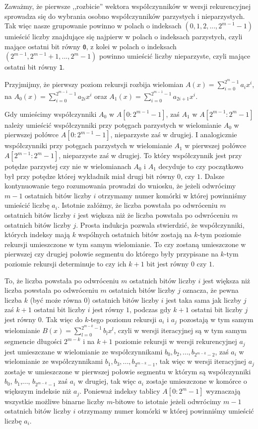 \documentclass{article}
\begin{document}
Zaważmy, że pierwsze ,,rozbicie'' wektora współczynników w wersji rekurencyjnej sprowadza się
do wybrania osobno współczynników parzystych i nieparzystych. Tak więc nasze grupowanie
powinno w polach o indeksach $(0,1,2,...,2^{m-1}-1)$ umieścić liczby znajdujące się najpierw 
w polach o indeksach parzystych, czyli mające ostatni bit równy \texttt{0}, z kolei 
w polach o indeksach $(2^{m-1},2^{m-1}+1,...,2^m-1)$ powinno umieścić liczby nieparzyste, czyli
mające ostatni bit równy \texttt{1}. 

Przyjmijmy, że pierwszy poziom rekursji rozbija wielomian
$A(x)=\sum_{i=0}^{2^m-1}a_ix^i$, na $A_0(x)=\sum_{i=0}^{2^{m-1}-1}a_{2i}x^{i}$ oraz
$A_1(x)=\sum_{i=0}^{2^{m-1}-1}a_{2i+1}x^{i}$. 

Gdy umieścimy współczynniki $A_0$ w $A[0:2^{m-1}-1]$, zaś $A_1$ w $A[2^{m-1}:2^m-1]$ należy umieścić 
współczynniki przy potęgach parzystych w wielomianie $A_0$ w pierwszej połówce 
$A[0:2^{m-1}-1]$, nieparzyste zaś w drugiej. I analogicznie współczynniki przy potęgach 
parzystych w wielomianie $A_1$ w pierwszej połówce 
$A[2^{m-1}:2^{m}-1]$, nieparzyste zaś w drugiej. To który współczynnik jest przy potędze 
parzystej czy nie w wielomianach $A_0$ i $A_1$ decyduje to czy początkowo był przy potędze
której wykładnik miał drugi bit równy $0$, czy $1$. Dalsze kontynuowanie tego rozumowania 
prowadzi do wniosku, że jeżeli odwrócimy $m-1$ ostatnich bitów liczby $i$ otrzymamy numer komórki
w której powinniśmy umieścić liczbę $a_i$. Istotnie załóżmy, że liczba powstała po odwróceniu $m$ ostatnich bitów liczby $i$ jest większa 
niż że liczba powstała po odwróceniu $m$ ostatnich bitów liczby $j$. Prosta indukcja pozwala stwierdzić, że współczynniki, których indeksy mają $k$ 
wspólnych ostatnich 
bitów zostają na $k$-tym poziomie rekursji umieszczone w tym samym wielomianie. 
To czy zostaną umieszczone w pierwszej czy drugiej połowie segmentu do którego były przypisane 
na $k$-tym poziomie rekursji determinuje to czy ich $k+1$ bit jest równy $0$ czy $1$.

To, że liczba powstała po odwróceniu $m$ ostatnich bitów liczby $i$ jest większa niż liczba powstała po odwróceniu 
$m$ ostatnich bitów liczby $j$ oznacza, że pewna liczba $k$ (być może równa 
$0$) ostatnich bitów liczby $i$ jest taka sama jak liczby $j$ 
zaś $k+1$ ostatni bit liczby $i$ jest równy $1$, podczas gdy $k+1$ ostatni bit liczby $j$
jest równy $0$.
Tak więc do $k$-tego poziomu rekursji $a_i$ i $a_j$ pozostają w tym samym wielomianie $B(x)=
\sum^{2^{m-k}-1}_{l=0} b_lx^l$, czyli w wersji iteracyjnej są w tym samym segmencie 
długości $2^{m-k}$ i na $k+1$ poziomie rekursji w wersji rekurencyjnej $a_j$ jest umieszczane w wielomianie
ze współczynnikami $b_0,b_2,...,b_{2^{m-k}-2}$, zaś $a_i$ w wielomianie ze współczynnikami
$b_1,b_3,...,b_{2^{m-k}-1}$, tak więc w wersji iteracyjnej $a_j$ zostaje w umieszczone w pierwszej połowie 
segmentu w którym są współczynniki $b_0$, $b_1$,..., $b_{2^{m-k}-1}$ zaś $a_i$ w drugiej, tak więc $a_i$ zostaje umieszczone w komórce o większym indeksie 
niż $a_j$. Ponieważ indeksy tablicy $A[0:2^m-1]$ 
wyznaczają wszystkie możliwe binarne liczby $m$-bitowe to istotnie jeżeli odwrócimy $m-1$ ostatnich bitów liczby $i$ otrzymamy numer komórki
w której powinniśmy umieścić liczbę $a_i$.
\end{document}
